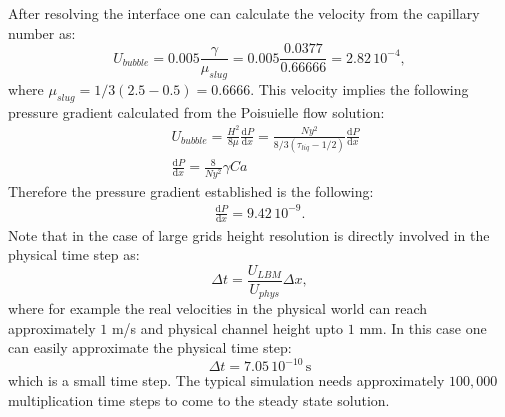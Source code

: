 \documentclass{article}
\begin{document}
\begin{description}
After resolving the interface one can  calculate the
  velocity from the capillary number as:
  \begin{equation}
  U_{bubble}=0.005 \frac{\gamma}{\mu_{slug}}=0.005
\frac{0.0377}{0.66666}=2.82\,10^{-4},
  \end{equation}
  where $\mu_{slug}=1/3 (2.5-0.5)=0.6666$.
  This velocity implies the following pressure gradient calculated from the
  Poisuielle flow solution:
  \begin{equation}
  \begin{aligned}
  &U_{bubble}=\frac{H^2}{8\mu} \frac{\mathrm{d}P}{\mathrm{d}x}=\frac{Ny^2}{8/3
  (\tau_{liq}-1/2)}\frac{\mathrm{d}P}{\mathrm{d}x}\\
  &\frac{\mathrm{d}P}{\mathrm{d}x}=\frac{8}{Ny^2}\gamma Ca
  \end{aligned}
  \end{equation}
  Therefore the pressure gradient established is the following:
  \begin{equation}
  \begin{aligned}
  \frac{\mathrm{d}P}{\mathrm{d}x}=9.42\, 10^{-9}.
  \end{aligned}
  \end{equation}
  Note that in the case of large grids  height resolution is directly
involved in	
the physical time step as:
\begin{equation}
\Delta t =\frac{U_{LBM}}{U_{phys}} \Delta x ,
\end{equation}
where for example the real velocities in the physical world can reach
approximately $1$ m/s and physical channel height upto $1$ mm. In this case one
can easily approximate the physical time step:
\begin{equation}
\Delta t = 7.05 \, 10^{-10} \,\mathrm{s}
\end{equation}
which is a small time step. The typical simulation needs approximately
$100,000$ multiplication time steps to come to the steady state solution.


\end{description}
\end{document}
